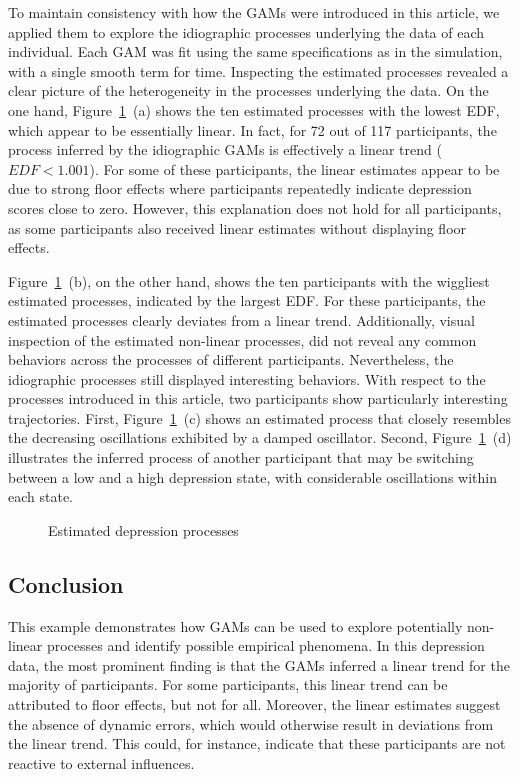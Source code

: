 \documentclass[man, floatsintext]{apa7}
\begin{document}
To maintain consistency with how the GAMs were introduced in this article, we
applied them to explore the idiographic processes underlying the data of each
individual. Each GAM was fit using the same specifications as in the
simulation, with a single smooth term for time. Inspecting the estimated
processes revealed a clear picture of the heterogeneity in the processes
underlying the data. On the one hand, Figure~\ref{fig:dem_smooth}~(a) shows the
ten estimated processes with the lowest EDF, which appear to be essentially
linear. In fact, for 72 out of 117 participants, the process inferred by the
idiographic GAMs is effectively a linear trend ($EDF < 1.001$). For some of
these participants, the linear estimates appear to be due to strong floor
effects where participants repeatedly indicate depression scores close to zero.
However, this explanation does not hold for all participants, as some
participants also received linear estimates without displaying floor effects.

Figure~\ref{fig:dem_smooth}~(b), on the other hand, shows the ten participants
with the wiggliest estimated processes, indicated by the largest EDF\@. For
these participants, the estimated processes clearly deviates from a linear
trend. Additionally, visual inspection of the estimated non-linear processes,
did not reveal any common behaviors across the processes of different
participants. Nevertheless, the idiographic processes still displayed
interesting behaviors. With respect to the processes introduced in this
article, two participants show particularly interesting trajectories. First,
Figure~\ref{fig:dem_smooth}~(c) shows an estimated process that closely
resembles the decreasing oscillations exhibited by a damped oscillator. Second,
Figure~\ref{fig:dem_smooth}~(d) illustrates the inferred process of another
participant that may be switching between a low and a high depression state,
with considerable oscillations within each state.

\begin{figure}[!t]
  \caption{Estimated depression processes}
  \label{fig:dem_smooth}
\end{figure}

\subsection{Conclusion}

This example demonstrates how GAMs can be used to explore potentially
non-linear processes and identify possible empirical phenomena. In this
depression data, the most prominent finding is that the GAMs inferred a linear
trend for the majority of participants. For some participants, this linear
trend can be attributed to floor effects, but not for all. Moreover, the linear
estimates suggest the absence of dynamic errors, which would otherwise
result in deviations from the linear trend. This could, for instance, indicate
that these participants are not reactive to external influences.
\end{document}
